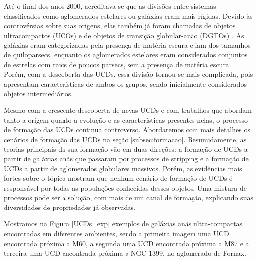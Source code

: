 Até o final dos anos 2000, acreditava-se que as divisões entre sistemas classificados como aglomerados estelares ou galáxias eram mais rígidas. Devido às controvérsias sobre suas origens, elas também já foram chamadas de objetos ultracompactos (UCOs) \citep{Mieske_2002} e de objetos de transição globular-anão (DGTOs) \citep{Hasegan_2005}. As galáxias eram categorizadas pela presença de matéria escura e iam dos tamanhos de quiloparsecs, enquanto os aglomerados estelares eram considerados conjuntos de estrelas com raios de poucos parsecs, sem a presença de matéria escura. Porém, com a descoberta das UCDs, essa divisão tornou-se mais complicada, pois apresentam características de ambos os grupos, sendo inicialmente considerados objetos intermediários.

Mesmo com a crescente descoberta de novas UCDs e com trabalhos que abordam tanto a origem quanto a evolução e as características presentes nelas, o processo de formação das UCDs continua controverso. Abordaremos com mais detalhes os cenários de formação das UCDs na seção \ref{subsec:formacao}. Resumidamente, as teorias principais da sua formação vão em duas direções: a formação de UCDs a partir de galáxias anãs que passaram por processos de stripping e a formação de UCDs a partir de aglomerados globulares massivos. Porém, as evidências mais fortes sobre o tópico mostram que nenhum cenário de formação de UCDs é responsável por todas as populações conhecidas desses objetos. Uma mistura de processos pode ser a solução, com mais de um canal de formação, explicando suas diversidades de propriedades já observadas.

Mostramos na Figura \ref{UCDs_exp} exemplos de galáxias anãs ultra-compactas encontradas em diferentes ambientes, sendo a primeira imagem uma UCD encontrada próxima a M60, a segunda uma UCD encontrada próxima a M87 e a terceira uma UCD encontrada próxima a NGC 1399, no aglomerado de Fornax.

